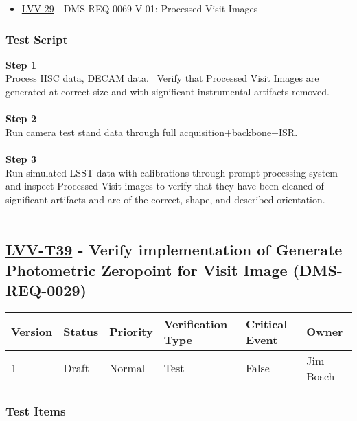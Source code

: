 \begin{itemize}
\tightlist
\item
  \href{https://jira.lsstcorp.org/browse/LVV-29}{LVV-29} -
  DMS-REQ-0069-V-01: Processed Visit Images
\end{itemize}

\hypertarget{test-script-15}{%
\subsubsection{Test Script}\label{test-script-15}}

\textbf{Step 1}\\
Process HSC data, DECAM data. ~Verify that Processed Visit Images are
generated at correct size and with significant instrumental artifacts
removed.\\
~\\
\textbf{Step 2}\\
Run camera test stand data through full acquisition+backbone+ISR.\\
~\\
\textbf{Step 3}\\
Run simulated LSST data with calibrations through prompt processing
system and inspect Processed Visit images to verify that they have been
cleaned of significant artifacts and are of the correct, shape, and
described orientation.\\
~\\

\hypertarget{lvv-t39---verify-implementation-of-generate-photometric-zeropoint-for-visit-image-dms-req-0029}{%
\subsection{\texorpdfstring{\href{https://jira.lsstcorp.org/secure/Tests.jspa\#/testCase/LVV-T39}{LVV-T39}
- Verify implementation of Generate Photometric Zeropoint for Visit
Image
(DMS-REQ-0029)}{LVV-T39 - Verify implementation of Generate Photometric Zeropoint for Visit Image (DMS-REQ-0029)}}\label{lvv-t39---verify-implementation-of-generate-photometric-zeropoint-for-visit-image-dms-req-0029}}

\begin{longtable}[]{@{}llllll@{}}
\toprule
Version & Status & Priority & Verification Type & Critical Event &
Owner\tabularnewline
\midrule
\endhead
1 & Draft & Normal & Test & False & Jim Bosch\tabularnewline
\bottomrule
\end{longtable}

\hypertarget{test-items-15}{%
\subsubsection{Test Items}\label{test-items-15}}


